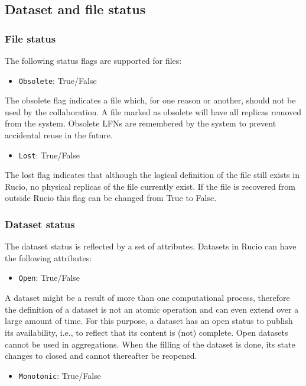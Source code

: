 \documentclass{atlasnote}
\newcommand{\code}[1]{\texttt{#1}}
\begin{document}
\subsection{Dataset and file status}

\subsubsection{File status}
\label{sec:file-status}

The following status flags are supported for files:

\begin{itemize}
\item {}
\code{Obsolete}: True/False
\end{itemize}

The obsolete flag indicates a file which, for one reason or another,
should not be used by the collaboration. A file marked as obsolete
will have all replicas removed from the system. Obsolete LFNs are
remembered by the system to prevent accidental reuse in the future.

\begin{itemize}
\item {}
\code{Lost}: True/False
\end{itemize}

The lost flag indicates that although the logical definition of the
file still exists in Rucio, no physical replicas of the file currently
exist. If the file is recovered from outside Rucio this flag can be
changed from True to False.

\subsubsection{Dataset status}
\label{sec:dataset-status}

\label{sec:status}
The dataset status is reflected by a set of attributes. Datasets in
Rucio can have the following attributes:
\begin{itemize}
\item {} 
\code{Open}: True/False

\end{itemize}

A dataset might be a result of more than one computational process,
therefore the definition of a dataset is not an atomic operation and
can even extend over a large amount of time. For this purpose, a
dataset has an open status to publish its availability, i.e., to
reflect that its content is (not) complete. Open datasets cannot be
used in aggregations. When the filling of the dataset is done, its
state changes to closed and cannot thereafter be reopened.
\begin{itemize}
\item {} 
\code{Monotonic}: True/False

\end{itemize}
\end{document}
